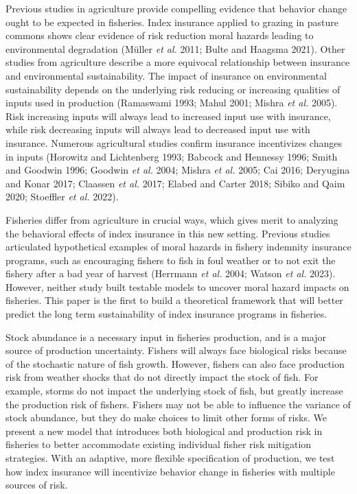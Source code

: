 \documentclass[
  letterpaper,
  DIV=11,
  numbers=noendperiod]{scrartcl}
\theoremstyle{plain}
\theoremstyle{plain}
\theoremstyle{remark}
\begin{document}
Previous studies in agriculture provide compelling evidence that
behavior change ought to be expected in fisheries. Index insurance
applied to grazing in pasture commons shows clear evidence of risk
reduction moral hazards leading to environmental degradation (Müller
\emph{et al.} 2011; Bulte and Haagsma 2021). Other studies from
agriculture describe a more equivocal relationship between insurance and
environmental sustainability. The impact of insurance on environmental
sustainability depends on the underlying risk reducing or increasing
qualities of inputs used in production (Ramaswami 1993; Mahul 2001;
Mishra \emph{et al.} 2005). Risk increasing inputs will always lead to
increased input use with insurance, while risk decreasing inputs will
always lead to decreased input use with insurance. Numerous agricultural
studies confirm insurance incentivizes changes in inputs (Horowitz and
Lichtenberg 1993; Babcock and Hennessy 1996; Smith and Goodwin 1996;
Goodwin \emph{et al.} 2004; Mishra \emph{et al.} 2005; Cai 2016;
Deryugina and Konar 2017; Claassen \emph{et al.} 2017; Elabed and Carter
2018; Sibiko and Qaim 2020; Stoeffler \emph{et al.} 2022).

Fisheries differ from agriculture in crucial ways, which gives merit to
analyzing the behavioral effects of index insurance in this new setting.
Previous studies articulated hypothetical examples of moral hazards in
fishery indemnity insurance programs, such as encouraging fishers to
fish in foul weather or to not exit the fishery after a bad year of
harvest (Herrmann \emph{et al.} 2004; Watson \emph{et al.} 2023).
However, neither study built testable models to uncover moral hazard
impacts on fisheries. This paper is the first to build a theoretical
framework that will better predict the long term sustainability of index
insurance programs in fisheries.

Stock abundance is a necessary input in fisheries production, and is a
major source of production uncertainty. Fishers will always face
biological risks because of the stochastic nature of fish growth.
However, fishers can also face production risk from weather shocks that
do not directly impact the stock of fish. For example, storms do not
impact the underlying stock of fish, but greatly increase the production
risk of fishers. Fishers may not be able to influence the variance of
stock abundance, but they do make choices to limit other forms of risks.
We present a new model that introduces both biological and production
risk in fisheries to better accommodate existing individual fisher risk
mitigation strategies. With an adaptive, more flexible specification of
production, we test how index insurance will incentivize behavior change
in fisheries with multiple sources of risk.
\end{document}
